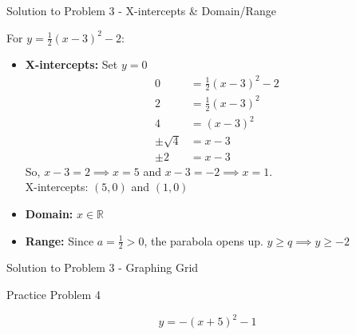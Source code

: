 \documentclass[aspectratio=169]{beamer}
\begin{document}
\begin{frame}{Solution to Problem 3 - X-intercepts & Domain/Range}
    \begin{tcolorbox}[colback=lightgray,colframe=accent,title=Solution 3 (Cont.)]
        \footnotesize
        For $y = \frac{1}{2}(x-3)^2 - 2$:
        \begin{itemize}
            \item \textbf{X-intercepts:} Set $y=0$
                \begin{align*}
                    0 &= \frac{1}{2}(x-3)^2 - 2 \\
                    2 &= \frac{1}{2}(x-3)^2 \\
                    4 &= (x-3)^2 \\
                    \pm\sqrt{4} &= x-3 \\
                    \pm 2 &= x-3
                \end{align*}
                So, $x-3=2 \implies x=5$ and $x-3=-2 \implies x=1$.\\
                X-intercepts: $(5,0)$ and $(1,0)$
            \item \textbf{Domain:} $x \in \mathbb{R}$
            \item \textbf{Range:} Since $a=\frac{1}{2}>0$, the parabola opens up. $y \geq q \implies y \geq -2$
        \end{itemize}
    \end{tcolorbox}
\end{frame}

\begin{frame}{Solution to Problem 3 - Graphing Grid}
    \centering
\end{frame}

\begin{frame}{Practice Problem 4}
    \begin{tcolorbox}[colback=lightgray,colframe=primary,title=Problem 4]
        \footnotesize
        \[ y = - (x+5)^2 - 1 \]
    \end{tcolorbox}
\end{frame}
\end{document}
